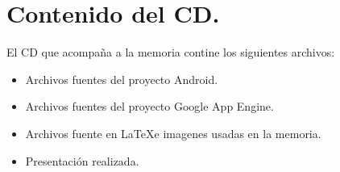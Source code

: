 \chapter{Contenido del CD.}

El CD que acompaña a la memoria contine los siguientes archivos:

\begin{itemize}

\item{Archivos fuentes del proyecto Android.}
\item{Archivos fuentes del proyecto Google App Engine.}
\item{Archivos fuente en \LaTeX e imagenes usadas en la memoria.}
\item{Presentación realizada.}

\end{itemize}
